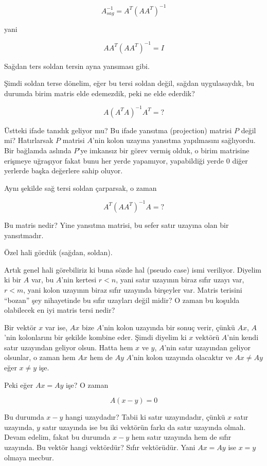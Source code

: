 \documentclass[12pt,fleqn]{article}\usepackage{../../common}
\begin{document}
$$ A_{sag}^{-1} = A^T(AA^T)^{-1} $$

yani 

$$ A A^T(AA^T)^{-1} = I$$

Sağdan ters soldan tersin ayna yansıması gibi. 

Şimdi soldan terse dönelim, eğer bu tersi soldan değil, sağdan
uygulasaydık, bu durumda birim matris elde edemezdik, peki ne elde ederdik?


$$ A (A^TA)^{-1} A^T = ?$$

Üstteki ifade tanıdık geliyor mu? Bu ifade yansıtma (projection) matrisi
$P$ değil mi? Hatırlarsak $P$ matrisi $A$'nin kolon uzayına yansıtma
yapılmasını sağlıyordu. Bir bağlamda aslında $P$'ye imkansız bir görev
vermiş olduk, o birim matrisine erişmeye uğraşıyor fakat bunu her yerde
yapamıyor, yapabildiği yerde 0 diğer yerlerde başka değerlere sahip
oluyor. 

Aynı şekilde sağ tersi soldan çarparsak, o zaman 

$$ A^T (AA^T)^{-1}A = ?$$

Bu matris nedir? Yine yansıtma matrisi, bu sefer satır uzayına olan bir
yansıtmadır. 

Özel hali gördük (sağdan, soldan). 

Artık genel hali görebiliriz ki buna sözde hal (pseudo case) ismi
veriliyor. Diyelim ki bir $A$ var, bu $A$'nin kertesi $r < n$, yani satır
uzayının biraz sıfır uzayı var, $r < m$, yani kolon uzayının biraz sıfır
uzayında birşeyler var. Matris terisini ``bozan'' şey nihayetinde bu sıfır
uzayları değil midir? O zaman bu koşulda olabilecek en iyi matris tersi
nedir?

Bir vektör $x$ var ise, $Ax$ bize $A$'nin kolon uzayında bir sonuç verir,
çünkü $Ax$, $A$'nin kolonlarını bir şekilde kombine eder. Şimdi diyelim ki
$x$ vektörü $A$'nin kendi satır uzayından geliyor olsun. Hatta hem $x$ ve
$y$, $A$'nin satır uzayından geliyor olsunlar, o zaman hem $Ax$ hem de $Ay$
$A$'nin kolon uzayında olacaktır ve $Ax \ne Ay$ eğer $x \ne y$ işe. 

Peki eğer $Ax = Ay$ işe? O zaman 

$$ A(x-y) = 0 $$

Bu durumda $x-y$ hangi uzaydadır? Tabii ki satır uzayındadır, çünkü $x$
satır uzayında, $y$ satır uzayında ise bu iki vektörün farkı da satır
uzayında olmalı. Devam edelim, fakat bu durumda $x-y$ hem satır uzayında
hem de sıfır uzayında. Bu vektör hangi vektördür? Sıfır vektörüdür. Yani
$Ax = Ay$ ise $x = y$ olmaya mecbur.
\end{document}
